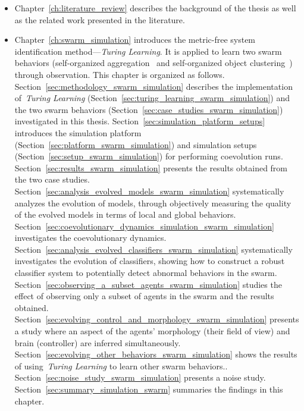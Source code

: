 \begin{itemize}
\item Chapter~\ref{ch:literature_review} describes the background of the thesis as well as the related work presented in the literature. 

\item Chapter~\ref{ch:swarm_simulation} introduces the metric-free system identification method---\textit{Turing Learning}. It is applied to learn two swarm behaviors (self-organized aggregation~\cite{Gauci2014_ijrr} and self-organized object clustering~\cite{Melvin2014_aamas}) through observation. This chapter is organized as follows. Section~\ref{sec:methodology_swarm_simulation} describes the implementation of~\textit{Turing Learning} (Section~\ref{sec:turing_learning_swarm_simulation}) and the two swarm behaviors (Section~\ref{sec:case_studies_swarm_simulation}) investigated in this thesis. Section~\ref{sec:simulation_platform_setups} introduces the simulation platform (Section~\ref{sec:platform_swarm_simulation}) and simulation setups (Section~\ref{sec:setup_swarm_simulation}) for performing coevolution runs. Section~\ref{sec:results_swarm_simulation} presents the results obtained from the two case studies. Section~\ref{sec:analysis_evolved_models_swarm_simulation} systematically analyzes the evolution of models, through objectively measuring the quality of the evolved models in terms of local and global behaviors. Section~\ref{sec:coevolutionary_dynamics_simulation_swarm_simulation} investigates the coevolutionary dynamics. Section~\ref{sec:analysis_evolved_classifiers_swarm_simulation} systematically investigates the evolution of classifiers, showing how to construct a robust classifier system to potentially detect abnormal behaviors in the swarm. Section~\ref{sec:observing_a_subset_agents_swarm_simulation} studies the effect of observing only a subset of agents in the swarm and the results obtained. Section~\ref{sec:evolving_control_and_morphology_swarm_simulation} presents a study where an aspect of the agents' morphology (their field of view) and brain (controller) are inferred simultaneously. Section~\ref{sec:evolving_other_behaviors_swarm_simulation} shows the results of using~\textit{Turing Learning} to learn other swarm behaviors.. Section~\ref{sec:noise_study_swarm_simulation} presents a noise study. Section~\ref{sec:summary_simulation_swarm} summaries the findings in this chapter.


\end{itemize}
